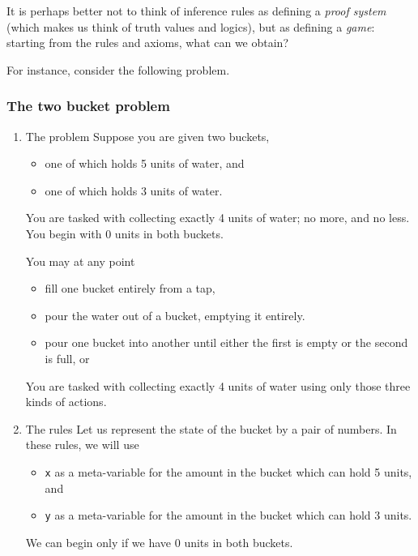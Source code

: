 \documentclass[11pt]{article}
\begin{document}
It is perhaps better not to think of inference rules
as defining a \emph{proof system} (which makes us think
of truth values and logics),
but as defining a \emph{game}: starting from
the rules and axioms, what can we obtain?

For instance, consider the following problem.

\subsubsection{The two bucket problem}
\label{sec:org0a88bdd}
\begin{enumerate}
\item The problem
\label{sec:org47dc42e}
Suppose you are given two buckets,
\begin{itemize}
\item one of which holds 5 units of water, and
\item one of which holds 3 units of water.
\end{itemize}

You are tasked with collecting exactly 4 units of water;
no more, and no less.
You begin with 0 units in both buckets.

You may at any point
\begin{itemize}
\item fill one bucket entirely from a tap,
\item pour the water out of a bucket, emptying it entirely.
\item pour one bucket into another until either the first is empty
or the second is full, or
\end{itemize}

You are tasked with collecting exactly 4 units of water
using only those three kinds of actions.

\item The rules
\label{sec:orgb3c3f00}
Let us represent the state of the bucket by a pair of numbers.
In these rules, we will use
\begin{itemize}
\item \texttt{x} as a meta-variable for the amount
in the bucket which can hold 5 units, and
\item \texttt{y} as a meta-variable for the amount
in the bucket which can hold 3 units.
\end{itemize}

We can begin only if we have 0 units in both buckets.
\begin{verbatim}


\end{verbatim}
\end{enumerate}
\end{document}
